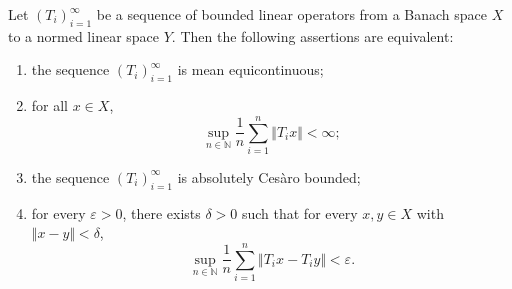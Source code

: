 \documentclass[10pt,a4paper]{amsart}
\begin{document}
\begin{thm}\label{thm:mean-UBT}
    Let $(T_i)_{i=1}^{\infty}$ be a sequence of bounded linear operators from a Banach space $X$ to a normed linear space $Y$.
    Then the following assertions are equivalent:
    \begin{enumerate}
        \item \label{thm1: ME}
              the sequence $(T_i)_{i=1}^{\infty}$  is mean equicontinuous;
        \item \label{thm2: x bounded}
             for all $x\in X$,
              \[
                  \sup_{n\in\mathbb{N}}\frac{1}{n}\sum_{i=1}^{n}\Vert T_i x\Vert<\infty;
              \]
        \item \label{thm3: aCb}
             the sequence $(T_i)_{i=1}^{\infty}$ is absolutely Ces\`aro bounded;
        \item \label{thm4: ME-sup}
             for every $\varepsilon>0$, there exists $\delta>0$ such that for every $x,y\in X$ with $\Vert x-y\Vert<\delta$,
              \[
                  \sup_{n\in\mathbb{N}}\frac{1}{n}\sum_{i=1}^{n}\Vert T_ix-T_iy\Vert<\varepsilon.
              \]

    \end{enumerate}
\end{thm}
\end{document}

